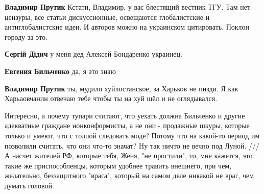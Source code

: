 \begin{itemize}
\begin{itemize}
\textbf{Владимир Прутик} Кстати, Владимир, у вас блестящий вестник ТГУ. Там нет цензуры, все статьи дискуссионные, освещаются глобалистские и антиглобалистские идеи. И авторов можно на украинском цитировать. Поклон городу за это.

 
\textbf{Сергій Дідич} у меня дед Алексей Бондаренко украинец.

 
\textbf{Евгения Бильченко} да, я это знаю

 
\textbf{Владимир Прутик} ты, мудило хуйлостанское, за Харьков не пизди. Я как Харьаовчанин отвечаю тебе чтобы ты на хуй шёл и не оглядывался.

 

Интересно, а почему тупари считают, что уехать должна Бильченко и другие
адекватные граждане нонконформисты, а не они - продажные шкуры, которые только
и умеют, что с толпой следовать моде? Потому что на какой-то период им
позволили считать, что они что-то значат? Ну так ничто не вечно под Луной. ///
А насчет жителей РФ, которые тебя, Женя, "не простили", то, мне кажется, это
такие же приспособленцы, которым удобнее травить внешнего, при чем, желательно,
беззащитного "врага", который на самом деле никакой не враг, чем думать
головой.

 

\end{itemize}
\end{itemize}
